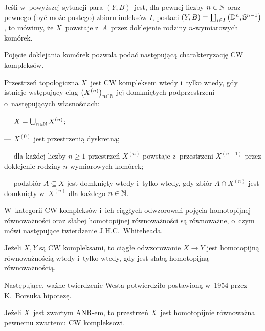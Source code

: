 Jeśli w~powyższej sytuacji para $(Y,B)$~jest, dla pewnej liczby $n\in\mathbb{N}$ oraz pewnego (być może pustego) zbioru indeksów $I$, postaci $(Y,B)=\coprod_{i\in I}\left(\mathbb{D}^n,\mathbb{S}^{n-1}\right)$, to mówimy, że $X$~powstaje z~$A$~przez doklejenie rodziny  $n$-wymiarowych komórek.

Pojęcie doklejania komórek pozwala podać następującą charakteryzację CW kompleksów.

\begin{stw}
Przestrzeń topologiczna $X$~jest CW kompleksem wtedy i~tylko wtedy, gdy istnieje wstępujący ciąg $\bigl(X^{(n)}\bigr)_{n\in\mathbb{N}}$ jej domkniętych podprzestrzeni o~następujących własnościach: 
\begin{compactitem}
\item[---] $X=\bigcup_{n\in\mathbb{N}} X^{(n)}$;
\item[---] $X^{(0)}$ jest przestrzenią dyskretną;
\item[---] dla każdej liczby $n\geq 1$ przestrzeń $X^{(n)}$ powstaje z~przestrzeni $X^{(n-1)}$ przez doklejenie rodziny $n$-wymiarowych komórek;
\item[---] podzbiór $A\subseteq X$ jest domknięty wtedy i~tylko wtedy, gdy zbiór $A\cap X^{(n)}$ jest domknięty w~$X^{(n)}$ dla każdego $n\in\mathbb{N}$.
\end{compactitem}
\end{stw}

W~kategorii CW kompleksów i~ich ciągłych odwzorowań pojęcia homotopijnej równoważności oraz słabej homotopijnej równoważności są równoważne, o~czym mówi następujące twierdzenie J.H.C.~Whiteheada.

\begin{tw}\label{tw-twierdzenie_whiteheada}
Jeżeli $X,Y$ są CW kompleksami, to ciągłe odwzorowanie $X\to Y$ jest homotopijną równoważnością wtedy i~tylko wtedy, gdy jest słabą homotopijną równoważnością. 
\end{tw}

Następujące, ważne twierdzenie Westa \cite{West77} potwierdziło postawioną w~1954 przez K.~Borsuka hipotezę.
\begin{tw}\label{tw-westa}
Jeżeli $X$~jest zwartym ANR-em, to przestrzeń $X$~jest homotopijnie równoważna pewnemu zwartemu CW kompleksowi.
\end{tw}





